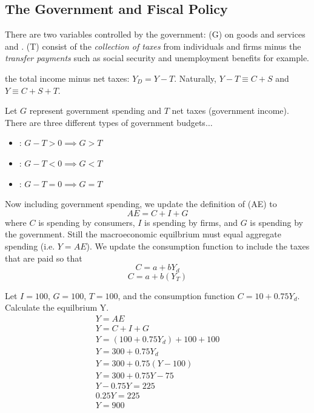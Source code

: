 \documentclass{article}
\begin{document}
\subsection{The Government and Fiscal Policy}

There are two variables controlled by the government:  (G) on goods and services and .  (T) consist of the \emph{collection of taxes} from individuals and firms minus the \emph{transfer payments} such as social security and unemployment benefits for example.  

\begin{definition}
  the total income minus net taxes: $Y_D = Y-T$. Naturally, $Y-T \equiv C+S$ and $Y \equiv C+S+T$. 
\end{definition}

Let $G$ represent government spending and $T$ net taxes (government income). There are three different types of government budgets$\dots$ 
\begin{itemize}
  \item {}: $G-T > 0 \implies G > T$
  \item {}: $G-T < 0 \implies G < T$ 
  \item {}: $G-T = 0 \implies G=T$
\end{itemize}

Now including government spending, we update the definition of  (AE) to $$AE = C + I + G$$ where $C$ is spending by consumers, $I$ is spending by firms, and $G$ is spending by the government. Still the macroeconomic equilbrium must equal aggregate spending (i.e. $Y = AE$). We update the consumption function to include the taxes that are paid so that $$C=a+bY_d$$ $$C=a+b(Y_T)$$ 
\begin{example}
  Let $I=100$, $G=100$, $T=100$, and the consumption function $C=10+0.75Y_d$. Calculate the equilbrium Y. 
  \begin{gather}
    Y=AE \\ 
    Y=C+I+G \\ 
    Y = (100 + 0.75Y_d) + 100 + 100 \\ 
    Y = 300 + 0.75Y_d \\ 
    Y = 300 + 0.75(Y-100) \\ 
    Y = 300 + 0.75Y - 75 \\ 
    Y - 0.75Y = 225 \\ 
    0.25Y = 225 \\
    Y = 900
  \end{gather}
\end{example}
\end{document}
